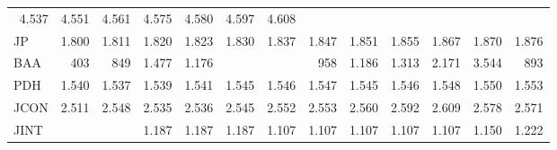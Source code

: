\begin{tabular}{lllllllllllll}
  \multicolumn{1}{r}{4.537} &
  \multicolumn{1}{r}{4.551} &
  \multicolumn{1}{r}{4.561} &
  \multicolumn{1}{r}{4.575} &
  \multicolumn{1}{r}{4.580} &
  \multicolumn{1}{r}{4.597} &
  \multicolumn{1}{r}{4.608} \\
\multicolumn{1}{l}{\hspace{1em}JP} &
  \multicolumn{1}{|r}{1.800} &
  \multicolumn{1}{r}{1.811} &
  \multicolumn{1}{r}{1.820} &
  \multicolumn{1}{r}{1.823} &
  \multicolumn{1}{r}{1.830} &
  \multicolumn{1}{r}{1.837} &
  \multicolumn{1}{r}{1.847} &
  \multicolumn{1}{r}{1.851} &
  \multicolumn{1}{r}{1.855} &
  \multicolumn{1}{r}{1.867} &
  \multicolumn{1}{r}{1.870} &
  \multicolumn{1}{r}{1.876} \\
\multicolumn{1}{l}{\hspace{1em}BAA} &
  \multicolumn{1}{|r}{403} &
  \multicolumn{1}{r}{849} &
  \multicolumn{1}{r}{1.477} &
  \multicolumn{1}{r}{1.176} &
  \multicolumn{1}{r}{} &
  \multicolumn{1}{r}{} &
  \multicolumn{1}{r}{958} &
  \multicolumn{1}{r}{1.186} &
  \multicolumn{1}{r}{1.313} &
  \multicolumn{1}{r}{2.171} &
  \multicolumn{1}{r}{3.544} &
  \multicolumn{1}{r}{893} \\
\multicolumn{1}{l}{\hspace{1em}PDH} &
  \multicolumn{1}{|r}{1.540} &
  \multicolumn{1}{r}{1.537} &
  \multicolumn{1}{r}{1.539} &
  \multicolumn{1}{r}{1.541} &
  \multicolumn{1}{r}{1.545} &
  \multicolumn{1}{r}{1.546} &
  \multicolumn{1}{r}{1.547} &
  \multicolumn{1}{r}{1.545} &
  \multicolumn{1}{r}{1.546} &
  \multicolumn{1}{r}{1.548} &
  \multicolumn{1}{r}{1.550} &
  \multicolumn{1}{r}{1.553} \\
\multicolumn{1}{l}{\hspace{1em}JCON} &
  \multicolumn{1}{|r}{2.511} &
  \multicolumn{1}{r}{2.548} &
  \multicolumn{1}{r}{2.535} &
  \multicolumn{1}{r}{2.536} &
  \multicolumn{1}{r}{2.545} &
  \multicolumn{1}{r}{2.552} &
  \multicolumn{1}{r}{2.553} &
  \multicolumn{1}{r}{2.560} &
  \multicolumn{1}{r}{2.592} &
  \multicolumn{1}{r}{2.609} &
  \multicolumn{1}{r}{2.578} &
  \multicolumn{1}{r}{2.571} \\
\multicolumn{1}{l}{\hspace{1em}JINT} &
  \multicolumn{1}{|r}{} &
  \multicolumn{1}{r}{} &
  \multicolumn{1}{r}{1.187} &
  \multicolumn{1}{r}{1.187} &
  \multicolumn{1}{r}{1.187} &
  \multicolumn{1}{r}{1.107} &
  \multicolumn{1}{r}{1.107} &
  \multicolumn{1}{r}{1.107} &
  \multicolumn{1}{r}{1.107} &
  \multicolumn{1}{r}{1.107} &
  \multicolumn{1}{r}{1.150} &
  \multicolumn{1}{r}{1.222} \\

\end{tabular}
